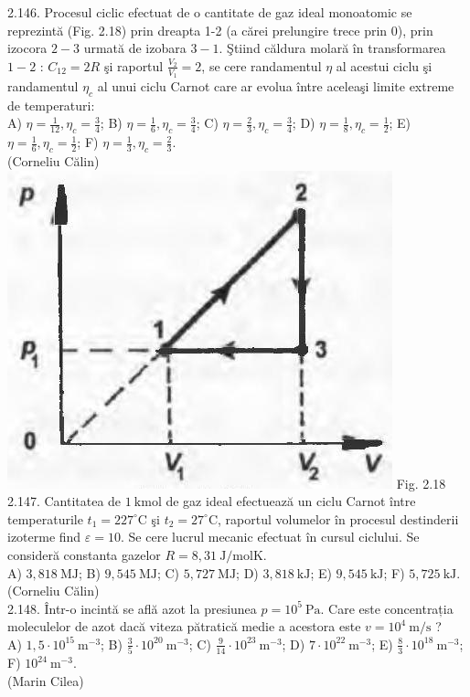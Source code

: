 2.146. Procesul ciclic efectuat de o cantitate de gaz ideal monoatomic se reprezintă (Fig. 2.18) prin dreapta 1-2 (a cărei prelungire trece prin 0), prin izocora $2-3$ urmată de izobara $3-1$. Ştiind căldura molară în transformarea $1-2$ : $C_{12}=2 R$ şi raportul $\frac{V_{2}}{V_{1}}=2$, se cere randamentul $\eta$ al acestui ciclu şi randamentul $\eta_{c}$ al unui ciclu Carnot care ar evolua între aceleaşi limite extreme de temperaturi:\\ A) $\eta=\frac{1}{12}, \eta_{c}=\frac{3}{4}$; B) $\eta=\frac{1}{6}, \eta_{c}=\frac{3}{4}$; C) $\eta=\frac{2}{3}, \eta_{c}=\frac{3}{4}$; D) $\eta=\frac{1}{8}, \eta_{c}=\frac{1}{2}$; E) $\eta=\frac{1}{6}, \eta_{c}=\frac{1}{2}$; F) $\eta=\frac{1}{3}, \eta_{c}=\frac{2}{3}$.\\ (Corneliu Călin)\\ \includegraphics[width=0.4\linewidth]{images/2025_07_01_5b3ff9fa0d508c8e9f17g-106} Fig. 2.18\\

2.147. Cantitatea de $1 \mathrm{~kmol}$ de gaz ideal efectuează un ciclu Carnot între temperaturile $t_{1}=227^{\circ} \mathrm{C}$ şi $t_{2}=27^{\circ} \mathrm{C}$, raportul volumelor în procesul destinderii izoterme find $\varepsilon=10$. Se cere lucrul mecanic efectuat în cursul ciclului. Se consideră constanta gazelor $R=8,31 \mathrm{~J} / \mathrm{mol} \mathrm{K}$.\\ A) $3,818 \mathrm{~MJ}$; B) $9,545 \mathrm{~MJ}$; C) $5,727 \mathrm{~MJ}$; D) $3,818 \mathrm{~kJ}$; E) $9,545 \mathrm{~kJ}$; F) $5,725 \mathrm{~kJ}$.\\ (Corneliu Călin)\\

2.148. Într-o incintă se află azot la presiunea $p=10^{5} \mathrm{~Pa}$. Care este concentrația moleculelor de azot dacă viteza pătratică medie a acestora este $v=10^{4} \mathrm{~m} / \mathrm{s}$ ?\\ A) $1,5 \cdot 10^{15} \mathrm{~m}^{-3}$; B) $\frac{3}{5} \cdot 10^{20} \mathrm{~m}^{-3}$; C) $\frac{9}{14} \cdot 10^{23} \mathrm{~m}^{-3}$; D) $7 \cdot 10^{22} \mathrm{~m}^{-3}$; E) $\frac{8}{3} \cdot 10^{18} \mathrm{~m}^{-3}$; F) $10^{24} \mathrm{~m}^{-3}$.\\ (Marin Cilea)\\

